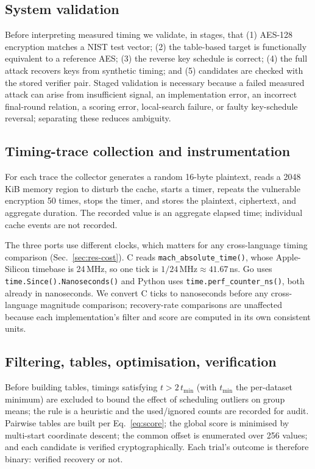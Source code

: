 \documentclass[11pt]{article}
\begin{document}
\subsection{System validation}
Before interpreting measured timing we validate, in stages, that (1) AES-128
encryption matches a NIST test vector; (2) the table-based target is functionally
equivalent to a reference AES; (3) the reverse key schedule is correct; (4) the
full attack recovers keys from synthetic timing; and (5) candidates are checked
with the stored verifier pair. Staged validation is necessary because a failed
measured attack can arise from insufficient signal, an implementation error, an
incorrect final-round relation, a scoring error, local-search failure, or faulty
key-schedule reversal; separating these reduces ambiguity.

\subsection{Timing-trace collection and instrumentation}
\label{sec:method-collect}
For each trace the collector generates a random 16-byte plaintext, reads a
2048\,KiB memory region to disturb the cache, starts a timer, repeats the
vulnerable encryption 50 times, stops the timer, and stores the plaintext,
ciphertext, and aggregate duration. The recorded value is an aggregate elapsed
time; individual cache events are not recorded.

The three ports use different clocks, which matters for any cross-language
timing comparison (Sec.~\ref{sec:res-cost}). C reads
\texttt{mach\_absolute\_time()}, whose Apple-Silicon timebase is 24\,MHz, so one
tick is $1/24\,\mathrm{MHz}\approx 41.67$\,ns. Go uses
\texttt{time.Since().Nanoseconds()} and Python uses
\texttt{time.perf\_counter\_ns()}, both already in nanoseconds. We convert C ticks
to nanoseconds before any cross-language magnitude comparison; recovery-rate
comparisons are unaffected because each implementation's filter and score are
computed in its own consistent units.

\subsection{Filtering, tables, optimisation, verification}
Before building tables, timings satisfying $t>2\,t_{\min}$ (with $t_{\min}$ the
per-dataset minimum) are excluded to bound the effect of scheduling outliers on
group means; the rule is a heuristic and the used/ignored counts are recorded for
audit. Pairwise tables are built per Eq.~\eqref{eq:score}; the global score is
minimised by multi-start coordinate descent; the common offset is enumerated over
256 values; and each candidate is verified cryptographically. Each trial's
outcome is therefore binary: verified recovery or not.
\end{document}
